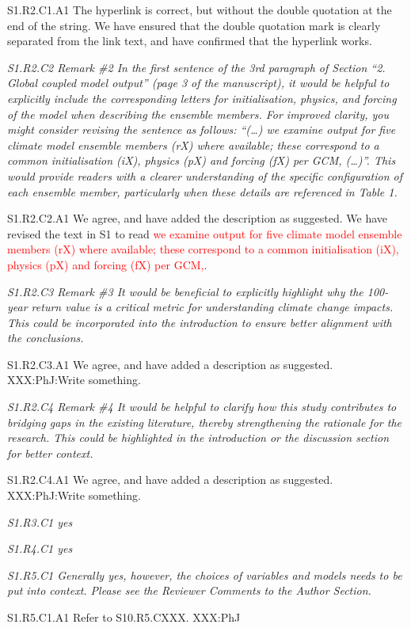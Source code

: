 \documentclass[a4paper,10pt]{article}
\newcommand{\ed}[1]{\textcolor{red}{#1}}
\begin{document}
	S1.R2.C1.A1 The hyperlink is correct, but without the double quotation at the end of the string. We have ensured that the double quotation mark is clearly separated from the link text, and have confirmed that the hyperlink works.
		
	\emph{S1.R2.C2 Remark \#2 In the first sentence of the 3rd paragraph of Section “2. Global coupled model output” (page 3 of the manuscript), it would be helpful to explicitly include the corresponding letters for initialisation, physics, and forcing of the model when describing the ensemble members. For improved clarity, you might consider revising the sentence as follows: “(…) we examine output for five climate model ensemble members (rX) where available; these correspond to a common initialisation (iX), physics (pX) and forcing (fX) per GCM, (…)”. This would provide readers with a clearer understanding of the specific configuration of each ensemble member, particularly when these details are referenced in Table 1.}
	
	S1.R2.C2.A1 We agree, and have added the description as suggested. We have revised the text in S1 to read \ed{we examine output for five climate model ensemble members (rX) where available; these correspond to a common initialisation (iX), physics (pX) and forcing (fX) per GCM,}.
	
	\emph{S1.R2.C3 Remark \#3 It would be beneficial to explicitly highlight why the 100-year return value is a critical metric for understanding climate change impacts. This could be incorporated into the introduction to ensure better alignment with the conclusions.}
	
	S1.R2.C3.A1 We agree, and have added a description as suggested. XXX:PhJ:Write something.

	\emph{S1.R2.C4 Remark \#4 It would be helpful to clarify how this study contributes to bridging gaps in the existing literature, thereby strengthening the rationale for the research. This could be highlighted in the introduction or the discussion section for better context.}
	
	S1.R2.C4.A1 We agree, and have added a description as suggested. XXX:PhJ:Write something.

	\emph{S1.R3.C1 yes}

	\emph{S1.R4.C1 yes}

	\emph{S1.R5.C1 Generally yes, however, the choices of variables and models needs to be put into context. Please see the Reviewer Comments to the Author Section.}
	
	S1.R5.C1.A1 Refer to S10.R5.CXXX. XXX:PhJ
	
\end{document}
